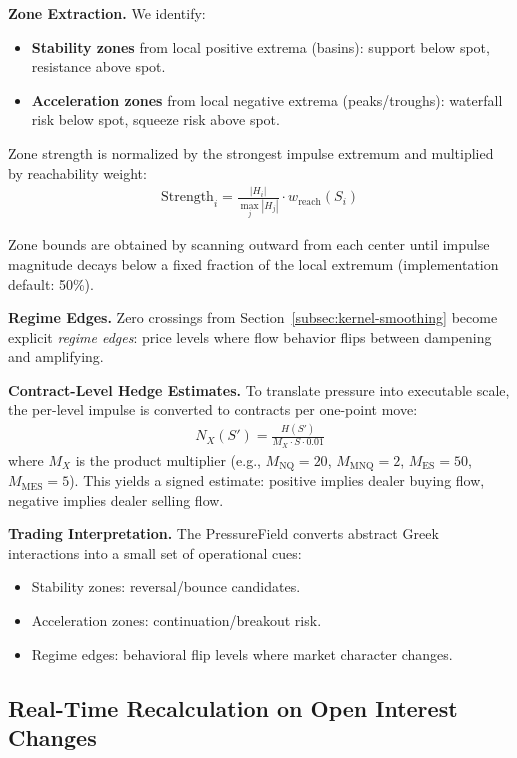 \documentclass[11pt, a4paper]{article}
\begin{document}
\textbf{Zone Extraction.} We identify:
\begin{itemize}
    \item \textbf{Stability zones} from local positive extrema (basins): support below spot, resistance above spot.
    \item \textbf{Acceleration zones} from local negative extrema (peaks/troughs): waterfall risk below spot, squeeze risk above spot.
\end{itemize}

Zone strength is normalized by the strongest impulse extremum and multiplied by reachability weight:
\begin{align}
\text{Strength}_i = \frac{|H_i|}{\max_j |H_j|} \cdot w_{\text{reach}}(S_i)
\end{align}

Zone bounds are obtained by scanning outward from each center until impulse magnitude decays below a fixed fraction of the local extremum (implementation default: 50\%).

\textbf{Regime Edges.} Zero crossings from Section~\ref{subsec:kernel-smoothing} become explicit \emph{regime edges}: price levels where flow behavior flips between dampening and amplifying.

\textbf{Contract-Level Hedge Estimates.} To translate pressure into executable scale, the per-level impulse is converted to contracts per one-point move:
\begin{align}
N_X(S') = \frac{H(S')}{M_X \cdot S \cdot 0.01}
\end{align}
where $M_X$ is the product multiplier (e.g., $M_{\text{NQ}}=20$, $M_{\text{MNQ}}=2$, $M_{\text{ES}}=50$, $M_{\text{MES}}=5$). This yields a signed estimate: positive implies dealer buying flow, negative implies dealer selling flow.

\textbf{Trading Interpretation.} The PressureField converts abstract Greek interactions into a small set of operational cues:
\begin{itemize}
    \item Stability zones: reversal/bounce candidates.
    \item Acceleration zones: continuation/breakout risk.
    \item Regime edges: behavioral flip levels where market character changes.
\end{itemize}

\subsection{Real-Time Recalculation on Open Interest Changes}
\end{document}
